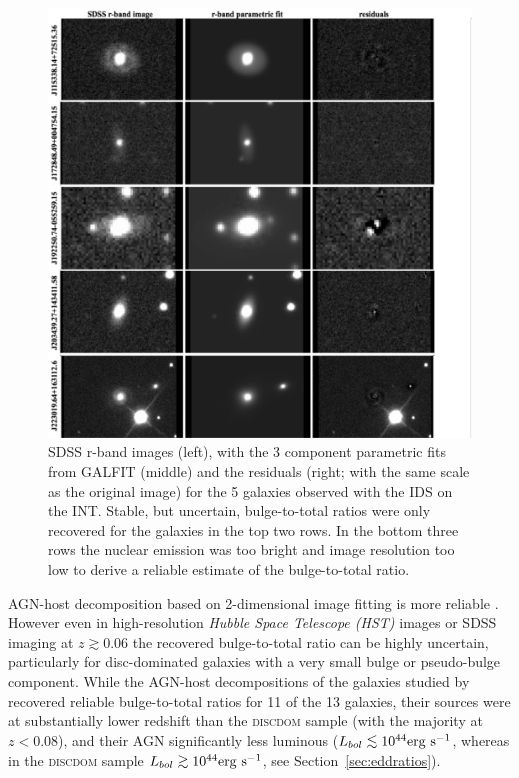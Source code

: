 \begin{figure}
\centering
\includegraphics[width=\textwidth]{agn/galfit_residuals.pdf}
\caption[Parametric fits and residuals for the 5 galaxies observed at the INT]{SDSS r-band images (left), with the 3 component parametric fits from GALFIT (middle) and the residuals (right; with the same scale as the original image) for the 5 galaxies observed with the IDS on the INT. Stable, but uncertain, bulge-to-total ratios were only recovered for the galaxies in the top two rows. In the bottom three rows the nuclear emission was too bright and image resolution too low to derive a reliable estimate of the bulge-to-total ratio.
}
\label{fig:galfit}
\end{figure}

AGN-host decomposition based on 2-dimensional image fitting \citep[e.g.,][]{simard98,peng02,peng10} is more reliable \citep[e.g.][]{mclure99,urry00,mclure01,sanchez04,pierce07,gabor09,Simmons11,Simmons13,koss11}. However even in high-resolution \emph{Hubble Space Telescope (HST)} images \citep{simmons08} or SDSS imaging at $z \gtrsim 0.06$ \citep[][]{koss11,simmons13} the recovered bulge-to-total ratio can be highly uncertain, particularly for disc-dominated galaxies with a very small bulge or pseudo-bulge \citep{kormendy04} component. While the AGN-host decompositions of the galaxies studied by \citet{simmons13} recovered reliable bulge-to-total ratios for 11 of the 13 galaxies, their sources were at substantially lower redshift than the \textsc{discdom} sample (with the majority at $z < 0.08$), and their AGN significantly less luminous ($L_{bol} \lesssim 10^{44} \rm{erg}~\rm{s}^{-1}$, whereas in the \textsc{discdom} sample $L_{bol} \gtrsim 10^{44} \rm{erg}~\rm{s}^{-1}$, see Section~\ref{sec:eddratios}). 

